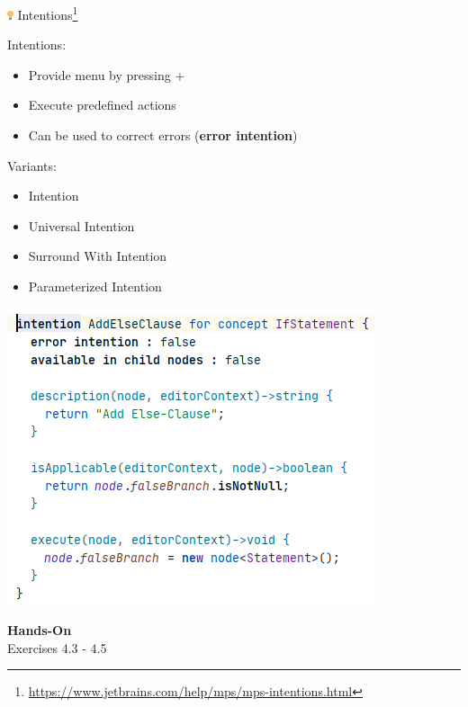 	\begin{frame}{\includegraphics[height=0.25cm]{graphics/intentions.png} Intentions\footnote{\url{https://www.jetbrains.com/help/mps/mps-intentions.html}}}
		\begin{minipage}{0.52\textwidth}
			Intentions:
			\begin{itemize}
				\item Provide \menu{\workshopintention} menu by pressing +\menu{\return}
				\item Execute predefined actions
				\item Can be used to correct errors (\textbf{error intention})
			\end{itemize}
			Variants:
			\begin{itemize}
				\item Intention
				\item Universal Intention
				\item Surround With Intention
				\item Parameterized Intention
			\end{itemize}
		\end{minipage}
		\begin{minipage}{0.4\textwidth}
			\includegraphics[height=0.8\textheight]{illustrations/intention.png}
		\end{minipage}
	\end{frame}

	\begin{frame}
		\begin{center}
			\Huge \textbf{Hands-On}\\
			
			Exercises 4.3 - 4.5
		\end{center}
	\end{frame}

